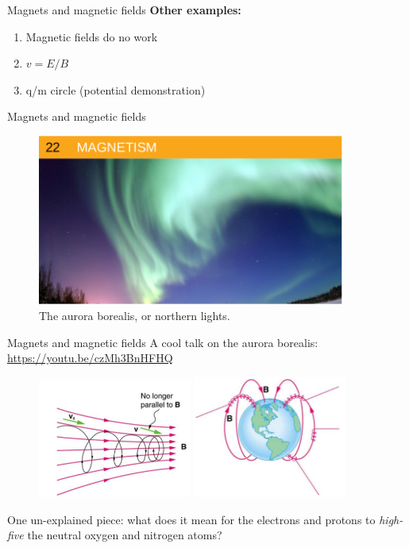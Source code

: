 \documentclass{beamer}
\begin{document}
\begin{frame}{Magnets and magnetic fields}
\textbf{Other examples:}
\begin{enumerate}
\item Magnetic fields do no work
\item $v = E/B$
\item q/m circle (potential demonstration)
\end{enumerate}
\end{frame}

\begin{frame}{Magnets and magnetic fields}
\begin{figure}
\centering
\includegraphics[width=0.9\textwidth]{figures/aurora.png}
\caption{\label{fig:aurora} The aurora borealis, or northern lights.}
\end{figure}
\end{frame}

\begin{frame}{Magnets and magnetic fields}
A cool talk on the aurora borealis:
\url{https://youtu.be/czMh3BnHFHQ} \\
\begin{figure}
\centering
\includegraphics[width=0.45\textwidth]{figures/mag1.png}
\includegraphics[width=0.45\textwidth]{figures/mag2.png}
\end{figure}
One un-explained piece: what does it mean for the electrons and protons to \textit{high-five} the neutral oxygen and nitrogen atoms?
\end{frame}
\end{document}
